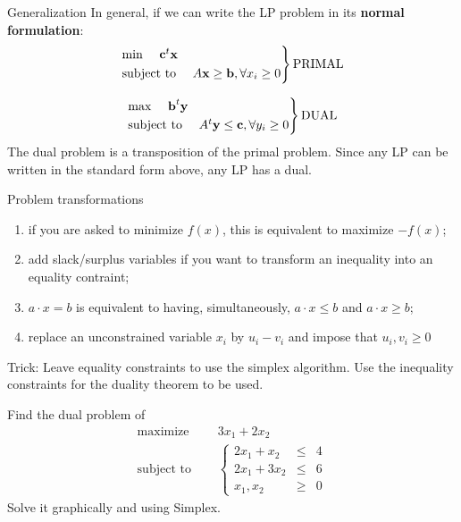 \documentclass[c]{beamer}
\begin{document}
\begin{frame}{Generalization}
In general, if we can write the LP problem in its {\bf normal formulation}:
\[
\begin{rcases}
\text{min }\quad\textbf{c}^t \textbf{x}\\
\text{subject to }\quad A\textbf{x}\geq \textbf{b}, \forall x_i\geq0
\end{rcases} \text{PRIMAL}
\]

\[
\begin{rcases}
\text{max }\quad\textbf{b}^t \textbf{y}\\
\text{subject to }\quad A^t\textbf{y}\leq \textbf{c}, \forall y_i\geq0
\end{rcases} \text{DUAL}
\]
The dual problem is a transposition of the primal problem. Since any LP can be written in the standard form
above, any LP has a dual.
\end{frame}

\begin{frame}{Problem transformations}
  \begin{enumerate}
    \item if you are asked to minimize $f(x)$, this is equivalent to maximize $-f(x)$;
    \item add slack/surplus variables if you want to transform an inequality into an equality contraint;
    \item $a\cdot x=b$ is equivalent to having, simultaneously, $a \cdot x \leq b$ and $a \cdot x \geq b$;
    \item replace an unconstrained variable $x_i$ by $u_i-v_i$ and impose that $u_i,v_i \geq 0$
  \end{enumerate}
  Trick: Leave equality constraints to use the simplex algorithm. Use the inequality constraints for the duality theorem to be used.
\end{frame}

\begin{frame}{}
\begin{Exercise}
  Find the dual problem of
  \begin{equation*}
  \begin{aligned}
    \text{maximize } \quad & 3x_1 +2x_2 \\
    \text{subject to }\quad &
    \left\{
    \begin{array}{rcl}
      2x_1+x_2 &\leq &4 \\
      2x_1+3x_2 &\leq &6 \\
      x_1,x_2 &\geq& 0
    \end{array}
    \right.
  \end{aligned}
\end{equation*}
Solve it graphically and using Simplex. 
\end{Exercise}
\end{frame}
\end{document}
